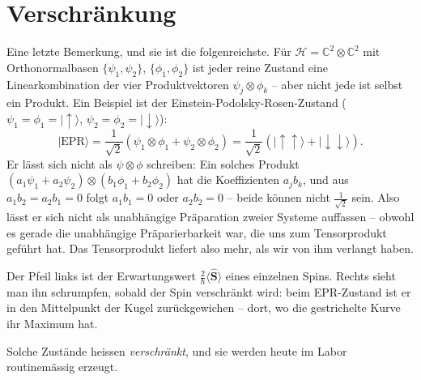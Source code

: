 \section*{Verschränkung}
Eine letzte Bemerkung, und sie ist die folgenreichste. Für $\mathcal{H} = \mathbb{C}^2\otimes\mathbb{C}^2$ mit Orthonormalbasen $\{\psi_1,\psi_2\}$, $\{\phi_1,\phi_2\}$ ist jeder reine Zustand eine Linearkombination der vier Produktvektoren $\psi_j\otimes\phi_k$ -- aber nicht jede ist selbst ein Produkt. Ein Beispiel ist der Einstein-Podolsky-Rosen-Zustand ($\psi_1=\phi_1=|\uparrow\rangle$, $\psi_2=\phi_2=|\downarrow\rangle$):
\begin{equation}
	|\text{EPR}\rangle = \frac{1}{\sqrt{2}}\left(\psi_1\otimes\phi_1 + \psi_2\otimes\phi_2\right) = \frac{1}{\sqrt{2}}\left(|\uparrow\uparrow\rangle + |\downarrow\downarrow\rangle\right).
\end{equation}
Er lässt sich nicht als $\psi\otimes\phi$ schreiben: Ein solches Produkt $(a_1\psi_1+a_2\psi_2)\otimes(b_1\phi_1+b_2\phi_2)$ hat die Koeffizienten $a_jb_k$, und aus $a_1b_2 = a_2b_1 = 0$ folgt $a_1b_1 = 0$ oder $a_2b_2 = 0$ -- beide können nicht $\tfrac{1}{\sqrt{2}}$ sein. Also lässt er sich nicht als unabhängige Präparation zweier Systeme auffassen -- obwohl es gerade die unabhängige Präparierbarkeit war, die uns zum Tensorprodukt geführt hat. Das Tensorprodukt liefert also mehr, als wir von ihm verlangt haben.



Der Pfeil links ist der Erwartungswert $\tfrac{2}{\hbar}\langle\widehat{\mathbf{S}}\rangle$ eines einzelnen Spins. Rechts sieht man ihn schrumpfen, sobald der Spin verschränkt wird: beim EPR-Zustand ist er in den Mittelpunkt der Kugel zurückgewichen -- dort, wo die gestrichelte Kurve ihr Maximum hat.

Solche Zustände heissen \emph{verschränkt}, und sie werden heute im Labor routinemässig erzeugt.
